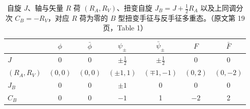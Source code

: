 \begin{table}[htbp]
\centering
\caption{自旋 $J$、轴与矢量 $R$ 荷 $(R_A,R_V)$、扭变自旋 $J_B=J+\frac12R_A$ 以及上同调分次 $C_B=-R_V$，对应 $R$ 荷为零的 $B$ 型扭变手征与反手征多重态。（原文第 19 页，Table 1）}
\begin{tabular}{lcccccc}
\toprule
 & $\phi$ & $\bar\phi$ & $\psi_\pm$ & $\bar\psi_\pm$ & $F$ & $\bar F$\\
\midrule
$J$ & 0 & 0 & $\pm\frac12$ & $\pm\frac12$ & 0 & 0\\
$(R_A,R_V)$ & $(0,0)$ & $(0,0)$ & $(\pm1,1)$ & $(\mp1,-1)$ & $(0,2)$ & $(0,-2)$\\
$J_B$ & 0 & 0 & $\pm1$ & 0 & 0 & 0\\
$C_B$ & 0 & 0 & $-1$ & 1 & $-2$ & 2\\
\bottomrule
\end{tabular}
\end{table}

